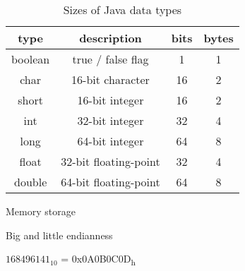\documentclass[../index.tex]{subfiles}
\begin{document}
\begin{frame}{\currenttitle}
%
%
%
  \begin{table}
    \begin{tabular}{c c c c}
      type & description & bits & bytes \\
      \hline{}
      boolean & true / false flag & 1 & 1\footnotemark \\
      char & 16-bit character & 16 & 2 \\
      short & 16-bit integer & 16 & 2 \\
      int & 32-bit integer & 32 & 4 \\
      long & 64-bit integer & 64 & 8 \\
      float & 32-bit floating-point & 32 & 4 \\
      double & 64-bit floating-point & 64 & 8 \\
    \end{tabular}
    \caption{Sizes of Java data types}
  \end{table}

\end{frame}

\renewcommand{\currenttitle}{Memory storage}
\begin{frame}{\currenttitle}
\end{frame}

\renewcommand{\currenttitle}{Big and little endianness}
\begin{frame}{\currenttitle}
%

  $168496141_{10}$ = 0x0A0B0C0D\textsubscript{h}

\end{frame}
\end{document}
